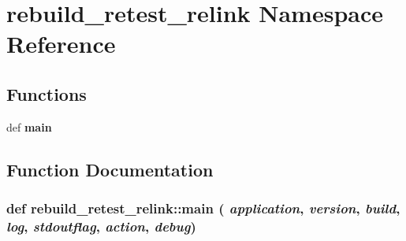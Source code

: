 \section{rebuild\_\-retest\_\-relink Namespace Reference}
\label{namespacerebuild__retest__relink}


\subsection*{Functions}
\begin{CompactItemize}
\item 
def {\bf main}
\end{CompactItemize}


\subsection{Function Documentation}
\subsubsection{\setlength{\rightskip}{0pt plus 5cm}def rebuild\_\-retest\_\-relink::main ( {\em application},  {\em version},  {\em build},  {\em log},  {\em stdoutflag},  {\em action},  {\em debug})}\label{namespacerebuild__retest__relink_a3ff09f4dc90b413361e9086ea8567bc}


